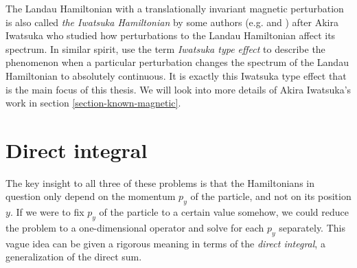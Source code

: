 The Landau Hamiltonian with a translationally invariant magnetic perturbation is also called \textit{the Iwatsuka Hamiltonian} by some authors (e.g. \citet{Miranda2018} and \citet{Hislop2015}) after Akira Iwatsuka who studied how perturbations to the Landau Hamiltonian affect its spectrum. In similar spirit, \citet{Exner2018} use the term \textit{Iwatsuka type effect} to describe the phenomenon when a particular perturbation changes the spectrum of the Landau Hamiltonian to absolutely continuous. It is exactly this Iwatsuka type effect that is the main focus of this thesis. We will look into more details of Akira Iwatsuka's work in section \ref{section-known-magnetic}.



\section{Direct integral}
The key insight to all three of these problems is that the Hamiltonians in question only depend on the momentum $p_y$ of the particle, and not on its position $y$. If we were to fix $p_y$ of the particle to a certain value somehow, we could reduce the problem to a one-dimensional operator and solve for each $p_y$ separately. This vague idea can be given a rigorous meaning in terms of the \textit{direct integral}, a generalization of the direct sum.

